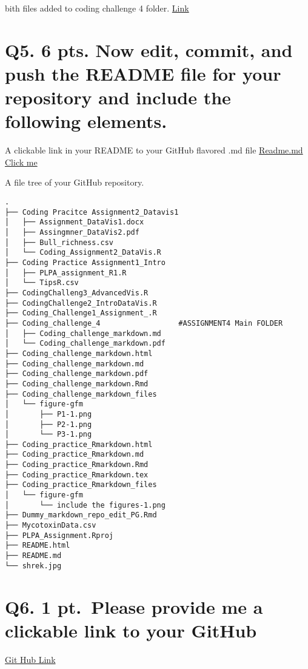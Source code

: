 \documentclass[
]{article}
\begin{document}
bith files added to coding challenge 4 folder.
\href{https://github.com/ppg0001/PLPA_Assignment/tree/main/Coding_challenge_4}{Link}

\section{Q5. 6 pts. Now edit, commit, and push the README file for your
repository and include the following
elements.}\label{q5.-6-pts.-now-edit-commit-and-push-the-readme-file-for-your-repository-and-include-the-following-elements.}

A clickable link in your README to your GitHub flavored .md file
\href{https://github.com/ppg0001/PLPA_Assignment/blob/main/Coding_challenge_4/Coding_challenge_markdown.md}{Readme.md
Click me}

A file tree of your GitHub repository.

\begin{verbatim}
.
├── Coding Pracitce Assignment2_Datavis1
│   ├── Assignment_DataVis1.docx
│   ├── Assingmner_DataVis2.pdf
│   ├── Bull_richness.csv
│   └── Coding_Assignment2_DataVis.R
├── Coding Practice Assignment1_Intro
│   ├── PLPA_assignment_R1.R
│   └── TipsR.csv
├── CodingChalleng3_AdvancedVis.R
├── CodingChallenge2_IntroDataVis.R
├── Coding_Challenge1_Assignment_.R
├── Coding_challenge_4                  #ASSIGNMENT4 Main FOLDER
│   ├── Coding_challenge_markdown.md
│   └── Coding_challenge_markdown.pdf
├── Coding_challenge_markdown.html
├── Coding_challenge_markdown.md
├── Coding_challenge_markdown.pdf
├── Coding_challenge_markdown.Rmd
├── Coding_challenge_markdown_files
│   └── figure-gfm
│       ├── P1-1.png
│       ├── P2-1.png
│       └── P3-1.png
├── Coding_practice_Rmarkdown.html
├── Coding_practice_Rmarkdown.md
├── Coding_practice_Rmarkdown.Rmd
├── Coding_practice_Rmarkdown.tex
├── Coding_practice_Rmarkdown_files
│   └── figure-gfm
│       └── include the figures-1.png
├── Dummy_markdown_repo_edit_PG.Rmd
├── MycotoxinData.csv
├── PLPA_Assignment.Rproj
├── README.html
├── README.md
└── shrek.jpg
\end{verbatim}

\section{Q6. 1 pt.~Please provide me a clickable link to your
GitHub}\label{q6.-1-pt.-please-provide-me-a-clickable-link-to-your-github}

\href{https://github.com/ppg0001/PLPA_Assignment/tree/main}{Git Hub
Link}
\end{document}
